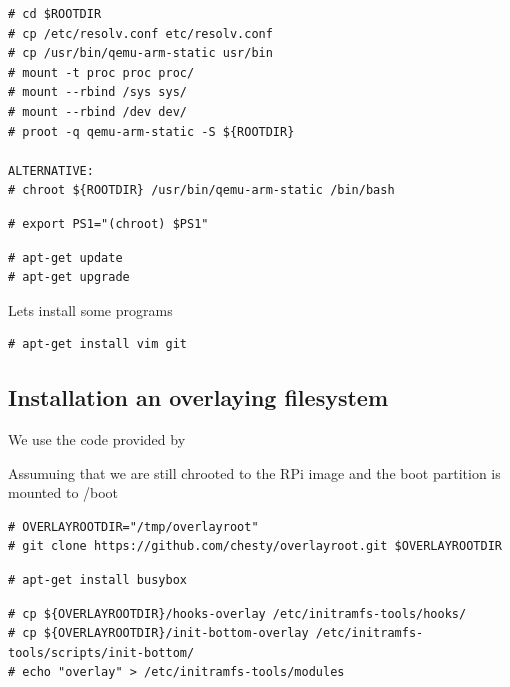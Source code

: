 \begin{lstlisting}[]
# cd $ROOTDIR
# cp /etc/resolv.conf etc/resolv.conf
# cp /usr/bin/qemu-arm-static usr/bin
# mount -t proc proc proc/
# mount --rbind /sys sys/
# mount --rbind /dev dev/
# proot -q qemu-arm-static -S ${ROOTDIR}

ALTERNATIVE:
# chroot ${ROOTDIR} /usr/bin/qemu-arm-static /bin/bash
\end{lstlisting}
\FloatBarrier


\begin{lstlisting}[]
# export PS1="(chroot) $PS1"
\end{lstlisting}
\FloatBarrier



\begin{lstlisting}[]
# apt-get update
# apt-get upgrade
\end{lstlisting}
\FloatBarrier

Lets install some programs
\begin{lstlisting}[]
# apt-get install vim git
\end{lstlisting}
\FloatBarrier



\subsection{Installation an overlaying filesystem}

We use the code provided by

Assumuing that we are still chrooted to the RPi image and the boot partition is mounted to /boot

\begin{lstlisting}[]
# OVERLAYROOTDIR="/tmp/overlayroot"
# git clone https://github.com/chesty/overlayroot.git $OVERLAYROOTDIR
\end{lstlisting}
\FloatBarrier

\begin{lstlisting}[]
# apt-get install busybox
\end{lstlisting}
\FloatBarrier

\begin{lstlisting}[]
# cp ${OVERLAYROOTDIR}/hooks-overlay /etc/initramfs-tools/hooks/
# cp ${OVERLAYROOTDIR}/init-bottom-overlay /etc/initramfs-tools/scripts/init-bottom/
# echo "overlay" > /etc/initramfs-tools/modules
\end{lstlisting}
\FloatBarrier

